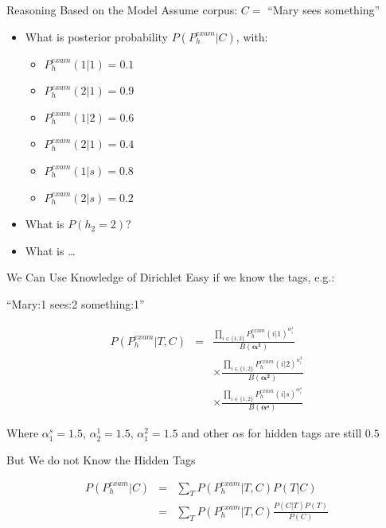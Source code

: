 \documentclass[11pt]{beamer}
\begin{document}
	
	\begin{frame}{Reasoning Based on the Model}
		Assume corpus: $C =$ ``Mary sees something''
		
		\vspace{10pt}\begin{itemize}
			\item What is posterior probability $P(P_{h}^{exam} | C)$, with:
				\begin{itemize}
					\item $P_{h}^{exam}(1|1) = 0.1$
					\item $P_{h}^{exam}(2|1) = 0.9$
					\item $P_{h}^{exam}(1|2) = 0.6$
					\item $P_{h}^{exam}(2|1) = 0.4$
					\item $P_{h}^{exam}(1|s) = 0.8$
					\item $P_{h}^{exam}(2|s) = 0.2$
				\end{itemize}
			\item What is $P(h_2 = 2)$?
			\item What is \dots
		\end{itemize}
	\end{frame}
	
	\begin{frame}{We Can Use Knowledge of Dirichlet}
		Easy if we know the tags, e.g.:
		
		\vspace{10pt} ``Mary:1 sees:2 something:1''
		
		\begin{align*}
			P(P_{h}^{exam}|T,C) & = & \frac{\prod_{i \in \{1,2\}} P_{h}^{exam}(i|1)^{\alpha_{i}^1}}{B(\boldsymbol{\alpha^1})} \\
			& & \times \frac{\prod_{i \in \{1,2\}} P_{h}^{exam}(i|2)^{\alpha_{i}^2}}{B(\boldsymbol{\alpha^2})} \\
			& & \times \frac{\prod_{i \in \{1,2\}} P_{h}^{exam}(i|s)^{\alpha_{i}^s}}{B(\boldsymbol{\alpha^s})}
		\end{align*}
		
		\vspace{10pt}
		Where $\alpha_{1}^s = 1.5$, $\alpha_{2}^1 = 1.5$, $\alpha_{1}^2 = 1.5$ and other $\alpha$s for hidden tags are still $0.5$
	\end{frame}
	
	\begin{frame}{But We do not Know the Hidden Tags}
		
		\begin{align*}
			P(P_{h}^{exam}|C) & = & \sum_{T} P(P_{h}^{exam}|T,C) P(T|C) \\
			& = & \sum_{T} P(P_{h}^{exam}|T,C) \frac{P(C|T)P(T)}{P(C)}
		\end{align*}
	\end{frame}
	
\end{document}
